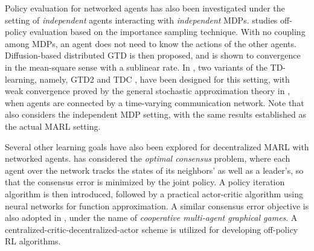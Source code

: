 Policy evaluation for networked agents has also been investigated under the setting of \emph{independent} agents interacting with \emph{independent} MDPs.   \cite{macua2015distributed} studies off-policy evaluation based on  the importance sampling technique. With no coupling among MDPs, an agent  does not need to know the actions of the other agents.  Diffusion-based distributed GTD is then proposed, and is shown to convergence in the mean-square sense with a sublinear rate. In  \cite{stankovic2016multi}, two variants of the TD-learning, namely, GTD2 and TDC \cite{sutton2009fast}, have been  designed for this setting, with weak convergence proved by the general stochastic approximation theory in \cite{stankovic2016distributed}, when agents are connected by a time-varying communication network. Note that \cite{cassano2018multi} also considers the independent MDP setting, with the same results established as the actual MARL setting. 


%  
%
%




\vspace{6pt}
\vspace{3pt}

Several other learning goals have also been explored for decentralized MARL with networked agents. \cite{zhang2016data} has considered  the \emph{optimal consensus}  problem, where each agent over the network tracks the states of its neighbors' as well as a leader's, so that the  consensus error is minimized by the joint policy. A policy iteration algorithm is then introduced,  followed by a practical  actor-critic algorithm using neural networks for function approximation. A similar consensus error objective is also adopted in \cite{zhang2018model}, under  the name of \emph{cooperative multi-agent graphical games}. A centralized-critic-decentralized-actor scheme is utilized for developing off-policy RL algorithms. 

